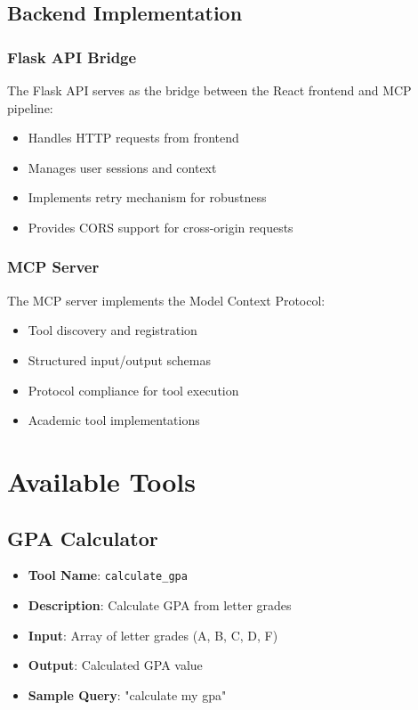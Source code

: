 \documentclass[12pt, a4paper]{report}
\begin{document}
\section{Backend Implementation}
\subsection{Flask API Bridge}
The Flask API serves as the bridge between the React frontend and MCP pipeline:
\begin{itemize}
    \item Handles HTTP requests from frontend
    \item Manages user sessions and context
    \item Implements retry mechanism for robustness
    \item Provides CORS support for cross-origin requests
\end{itemize}

\subsection{MCP Server}
The MCP server implements the Model Context Protocol:
\begin{itemize}
    \item Tool discovery and registration
    \item Structured input/output schemas
    \item Protocol compliance for tool execution
    \item Academic tool implementations
\end{itemize}

\chapter{Available Tools}

\section{GPA Calculator}
\begin{itemize}
    \item \textbf{Tool Name}: \texttt{calculate\_gpa}
    \item \textbf{Description}: Calculate GPA from letter grades
    \item \textbf{Input}: Array of letter grades (A, B, C, D, F)
    \item \textbf{Output}: Calculated GPA value
    \item \textbf{Sample Query}: "calculate my gpa"
\end{itemize}
\end{document}
